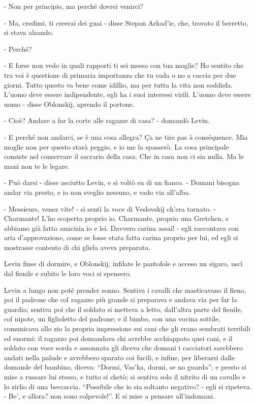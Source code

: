 - Non per principio, ma perché dovrei venirci? 

- Ma, credimi, ti creerai dei guai - disse Stepan Arkad'ic, che, trovato il berretto, si stava alzando. 

- Perché? 

- E forse non vedo in quali rapporti ti sei messo con tua moglie? Ho sentito che tra voi è questione di primaria importanza che tu vada o no a caccia per due giorni. Tutto questo va bene come idillio, ma per tutta la vita non soddisfa. L'uomo deve essere indipendente, egli ha i suoi interessi virili. L'uomo deve essere uomo - disse Oblonskij, aprendo il portone. 

- Cioè? Andare a far la corte alle ragazze di casa? - domandò Levin. 

- E perché non andarci, se è una cosa allegra? Ça ne tire pas à conséquence. Mia moglie non per questo starà peggio, e io me la spasserò. La cosa principale consiste nel conservare il sacrario della casa. Che in casa non ci sia nulla. Ma le mani non te le legare. 

- Può darsi - disse asciutto Levin, e si voltò su di un fianco. - Domani bisogna andar via presto, e io non sveglio nessuno, e vado via all'alba. 

- Messieurs, venez vite! - si sentì la voce di Veslovskij ch'era tornato. - Charmante! L'ho scoperta proprio io. Charmante, proprio una Gretchen, e abbiamo già fatto amicizia io e lei. Davvero carina assai! - egli raccontava con aria d'approvazione, come se fosse stata fatta carina proprio per lui, ed egli si mostrasse contento di chi gliela aveva preparata. 

Levin finse di dormire, e Oblonskij, infilate le pantofole e acceso un sigaro, uscì dal fienile e subito le loro voci si spensero. 

Levin a lungo non poté prender sonno. Sentiva i cavalli che masticavano il fieno, poi il padrone che col ragazzo più grande si preparava e andava via per far la guardia; sentiva poi che il soldato si metteva a letto, dall'altra parte del fienile, col nipote, un figlioletto del padrone; e il bimbo, con una vocina sottile, comunicava allo zio la propria impressione sui cani che gli erano sembrati terribili ed enormi; il ragazzo poi domandava chi avrebbe acchiappato quei cani, e il soldato con voce sorda e assonnata gli diceva che domani i cacciatori sarebbero andati nella palude e avrebbero sparato coi fucili, e infine, per liberarsi dalle domande del bambino, diceva: ``Dormi, Vas'ka, dormi, se no guarda''; e presto si mise a russare lui stesso, e tutto si chetò; si sentiva solo il nitrito di un cavallo e lo zirlio di una beccaccia. ``Possibile che io sia soltanto negativo? - egli si ripeteva. - Be', e allora? non sono colpevole!''. E si mise a pensare all'indomani. 

